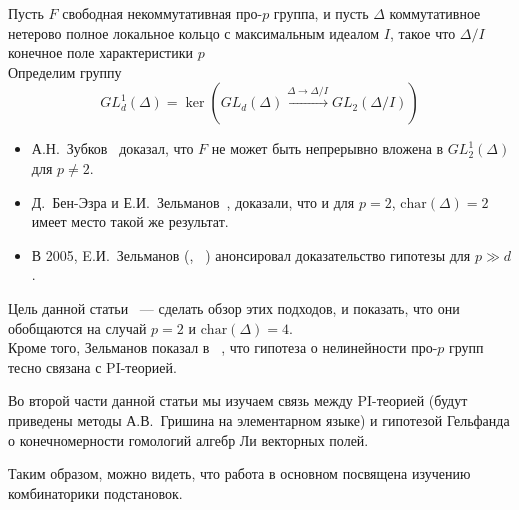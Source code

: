 Пусть $F$ свободная некоммутативная про-$p$ группа, и пусть $\Delta$ коммутативное нетерово полное локальное кольцо с максимальным идеалом $I$, такое что
$\Delta/I$ конечное поле характеристики $p$\\
Определим группу
\[GL_d^1(\Delta) = \ker\left( GL_d(\Delta) \xrightarrow{\Delta\to\Delta/I} GL_2(\Delta/I) \right)\]
\begin{itemize}
    \item А.Н.\ Зубков~\cite{Zubkov} доказал, что $F$ не может быть непрерывно вложена в $GL_2^1(\Delta)$ для $p\neq2$.
    \item Д.\ Бен-Эзра и Е.И.\ Зельманов~\cite{Ben-Ezra-Zelmanov}, доказали, что и для $p=2$, $\mathrm{char}(\Delta)=2$ имеет место такой же результат.
    \item В 2005, E.И.\ Зельманов (\cite{Zelmanov1}, ~\cite{Zelmanov2}) анонсировал доказательство гипотезы для $p\gg d$.
\end{itemize}

Цель данной статьи ~--- сделать обзор этих подходов, и показать, что они обобщаются на случай $p=2$ и $\mathrm{char}(\Delta)=4$.\\
Кроме того, Зельманов показал в ~\cite{Zelmanov1}, что гипотеза о нелинейности про-$p$ групп тесно связана с PI-теорией.

Во второй части данной статьи мы изучаем связь между PI-теорией (будут приведены методы А.В.\ Гришина на элементарном языке)
и гипотезой Гельфанда о конечномерности гомологий алгебр Ли векторных полей.

Таким образом, можно видеть, что работа в основном посвящена изучению комбинаторики подстановок.